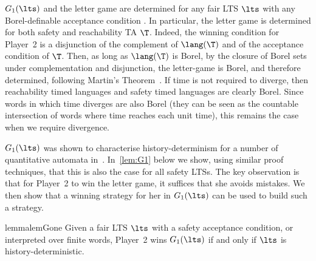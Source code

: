 \begin{remark}\label{determinacy} $G_1(\lts)$ and the letter game are determined for any fair LTS $\lts$ with any Borel-definable acceptance condition \cite{M1975}.
In particular, the letter game is determined for both safety and reachability TA $\T$. Indeed, the winning condition for Player~2 is a disjunction of the complement of $\lang(\T)$ and of the acceptance condition of $\T$. Then, as long as $\lang(\T)$ is Borel, by the closure of Borel sets under complementation and disjunction, the letter-game is Borel, and therefore determined, following Martin's Theorem~\cite{M1975}. If time is not required to diverge, then reachability timed languages and safety timed languages are clearly Borel. Since words in which time diverges are also Borel (they can be seen as the countable intersection of words where time reaches each unit time), this remains the case when we require divergence.
\end{remark}




$G_1(\lts)$ was shown to characterise history-determinism for a number of quantitative automata in~\cite{BL22}. In~\cref{lem:G1} below we show, using similar proof techniques, that this is also the case for all safety LTSs. The key observation is that for Player~2 to win the letter game, it suffices that she avoids mistakes. We then show that a winning strategy for her in $G_1(\lts)$ can be used to build such a strategy.

\begin{restatable}{lemma}{lemGone}\label{lem:G1}
Given a fair LTS $\lts$ with a safety acceptance condition, or interpreted over finite words, Player~2 wins $G_1(\lts)$ if and only if $\lts$ is history-deterministic.
\end{restatable}

